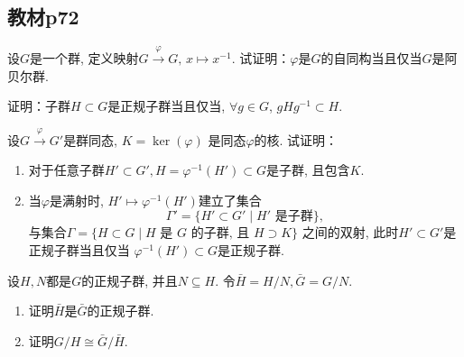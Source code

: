 \subsection{教材p72}

\begin{problem}
    设$G$是一个群, 定义映射$G \xrightarrow\varphi G,\, x \mapsto x^{-1}$.
试证明：$\varphi$是$G$的自同构当且仅当$G$是阿贝尔群.
\end{problem}

\begin{solution}
    
\end{solution}

\begin{problem}
    证明：子群$H \subset G$是正规子群当且仅当,
$\forall g \in G$, $gHg^{-1} \subset H$.
\end{problem}

\begin{solution}
    
\end{solution}

\begin{problem}
    设$G \xrightarrow\varphi G'$是群同态, $K = \ker(\varphi)$
是同态$\varphi$的核. 试证明：
\begin{enumerate}[(1)]
    \item 对于任意子群$H' \subset G', H = \varphi^{-1}(H') \subset G$是子群, 且包含$K$.
    \item 当$\varphi$是满射时, $H' \mapsto \varphi^{-1}(H')$建立了集合
\[
    \Gamma'=\{H' \subset G' \mid H' \text{ 是子群}\},
\]
与集合$\Gamma = \{H \subset G \mid H \text{ 是 }G \text{ 的子群, 且 } H \supset K\}$
之间的双射, 此时$H' \subset G'$是正规子群当且仅当
$\varphi^{-1}(H') \subset G$是正规子群.
\end{enumerate}
\end{problem}

\begin{solution}
    
\end{solution}

\begin{problem}
    设$H, N$都是$G$的正规子群, 并且$N \subseteq H$.
令$\bar{H} = H/N, \bar{G} = G/N$.
\begin{enumerate}[(1)]
    \item 证明$\bar{H}$是$\bar{G}$的正规子群.
    \item 证明$G/H \cong \bar{G}/\bar{H}$.
\end{enumerate}
\end{problem}

